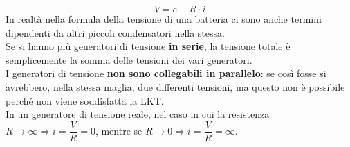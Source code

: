 \documentclass{article}
\begin{document}
\[
    V = e - R \cdot i
\]
In realtà nella formula della tensione di una batteria ci sono anche termini dipendenti da altri piccoli condensatori nella stessa.
\vspace*{0.2cm}\\
Se si hanno più generatori di tensione \textbf{in serie}, la tensione totale è semplicemente la somma delle tensioni dei vari generatori.\\
I generatori di tensione \textbf{\underline{non sono collegabili in parallelo}}: se così fosse si avrebbero, nella stessa maglia, due differenti tensioni, ma questo non è possibile perché non viene soddisfatta la LKT.
\vspace*{0.2cm}\\
In un generatore di tensione reale, nel caso in cui la resistenza $R \rightarrow \infty \Longrightarrow i = \dfrac{V}{R} = 0$, mentre se $R \rightarrow 0 \Longrightarrow i=\dfrac{V}{R}= \infty$.
\end{document}
